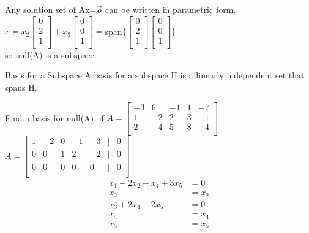 \begin{note} Any solution set of Ax=$\vec o$ can be written in parametric form.\\
$x=x_2\begin{bmatrix}
0\\
2\\
1\\
\end{bmatrix} + x_3 \begin{bmatrix}
0\\
0\\
1\\
\end{bmatrix} =$span$ \{ \begin{bmatrix}
0\\
2\\
1\\
\end{bmatrix} \begin{bmatrix}
0\\
0\\
1\\
\end{bmatrix} \}$\\
so null(A) is a subspace.
\end{note}
\begin{imp:defn}{Basis for a Subspace}{} A basis for a subspace H is a linearly independent set that spans H.
\end{imp:defn}
\begin{ex}
Find a basis for null(A), if
$A=\begin{bmatrix}
-3 & 6 & -1 & 1 &-7\\
1 & -2 & 2 & 3 & -1\\
2 & -4 & 5 & 8 &-4 \\
\end{bmatrix}$\\
$A=\begin{bmatrix}
1 & -2 & 0 & -1 & -3 & | & 0\\
0 & 0 & 1 & 2 & -2 & | & 0\\
0 & 0 & 0 & 0 & 0  & | & 0\\
\end{bmatrix}$
\begin{align*}
    x_1-2x_2-x_4+3x_5&=0\\
    x_2&=x_2\\
    x_3+2x_4-2x_5&=0\\
    x_4&=x_4\\
    x_5&=x_5
\end{align*}

\end{ex}